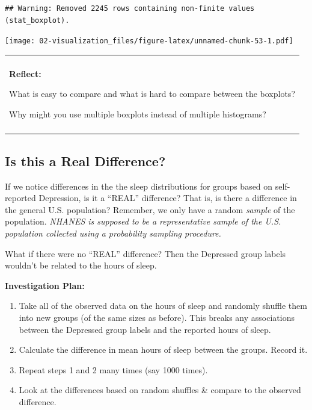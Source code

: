 \documentclass[
]{book}
\newenvironment{Shaded}{\begin{snugshade}}{\end{snugshade}}
\newcommand{\DataTypeTok}[1]{\textcolor[rgb]{0.13,0.29,0.53}{#1}}
\newcommand{\KeywordTok}[1]{\textcolor[rgb]{0.13,0.29,0.53}{\textbf{#1}}}
\newcommand{\NormalTok}[1]{#1}
\newcommand{\OperatorTok}[1]{\textcolor[rgb]{0.81,0.36,0.00}{\textbf{#1}}}
\newcommand{\StringTok}[1]{\textcolor[rgb]{0.31,0.60,0.02}{#1}}
\providecommand{\tightlist}{%
  \setlength{\itemsep}{0pt}\setlength{\parskip}{0pt}}
\newenvironment{reflect}
{
    \begin{center}
    
    \begin{tabular}{|p{0.8\textwidth}|}
    \rowcolor{LightBlue}
    \hline\\
    \rowcolor{LightBlue}
    \textbf{Reflect:}
}
{
    \\\rowcolor{LightBlue}
    \\\hline
    \end{tabular} 
    \end{center}
}
\begin{document}
\begin{Shaded}
\end{Shaded}

\begin{verbatim}
## Warning: Removed 2245 rows containing non-finite values (stat_boxplot).
\end{verbatim}

\texttt{[image: 02-visualization\_files/figure-latex/unnamed-chunk-53-1.pdf]}

\begin{reflect}
What is easy to compare and what is hard to compare between the
boxplots?

Why might you use multiple boxplots instead of multiple histograms?
\end{reflect}

\hypertarget{is-this-a-real-difference}{%
\subsection{Is this a Real Difference?}\label{is-this-a-real-difference}}

If we notice differences in the the sleep distributions for groups based on self-reported Depression, is it a ``REAL'' difference? That is, is there a difference in the general U.S. population? Remember, we only have a random \emph{sample} of the population. \emph{NHANES is supposed to be a representative sample of the U.S. population collected using a probability sampling procedure.}

What if there were no ``REAL'' difference? Then the Depressed group labels wouldn't be related to the hours of sleep.

\textbf{Investigation Plan:}

\begin{enumerate}
\def\labelenumi{\arabic{enumi}.}
\tightlist
\item
  Take all of the observed data on the hours of sleep and randomly shuffle them into new groups (of the same sizes as before). This breaks any associations between the Depressed group labels and the reported hours of sleep.
\item
  Calculate the difference in mean hours of sleep between the groups. Record it.
\item
  Repeat steps 1 and 2 many times (say 1000 times).
\item
  Look at the differences based on random shuffles \& compare to the observed difference.
\end{enumerate}
\end{document}
